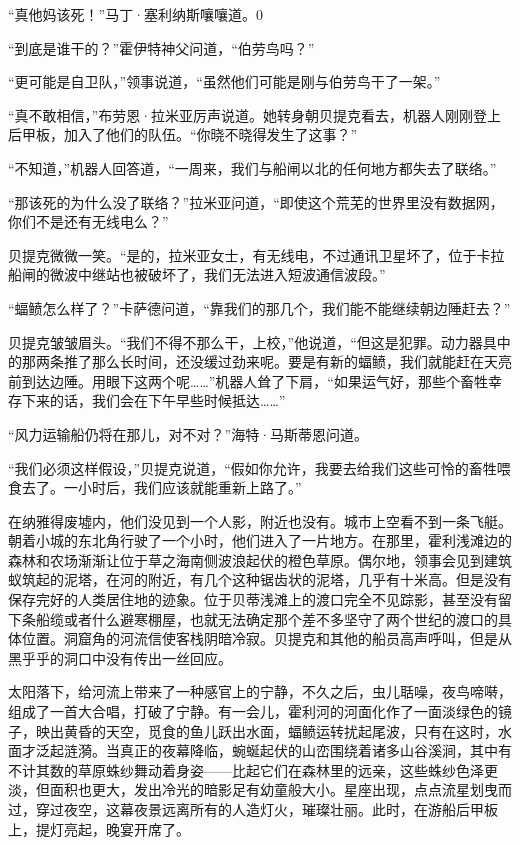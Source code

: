 \documentclass[AutoFakeBold=true]{book}
\begin{document}
``真他妈该死！''马丁·塞利纳斯嚷嚷道。0

``到底是谁干的？''霍伊特神父问道，``伯劳鸟吗？''

``更可能是自卫队，''领事说道，``虽然他们可能是刚与伯劳鸟干了一架。''

``真不敢相信，''布劳恩·拉米亚厉声说道。她转身朝贝提克看去，机器人刚刚登上后甲板，加入了他们的队伍。``你晓不晓得发生了这事？''

``不知道，''机器人回答道，``一周来，我们与船闸以北的任何地方都失去了联络。''

``那该死的为什么没了联络？''拉米亚问道，``即使这个荒芜的世界里没有数据网，你们不是还有无线电么？''

贝提克微微一笑。``是的，拉米亚女士，有无线电，不过通讯卫星坏了，位于卡拉船闸的微波中继站也被破坏了，我们无法进入短波通信波段。''

``蝠鲼怎么样了？''卡萨德问道，``靠我们的那几个，我们能不能继续朝边陲赶去？''

贝提克皱皱眉头。``我们不得不那么干，上校，''他说道，``但这是犯罪。动力器具中的那两条推了那么长时间，还没缓过劲来呢。要是有新的蝠鲼，我们就能赶在天亮前到达边陲。用眼下这两个呢……''机器人耸了下肩，``如果运气好，那些个畜牲幸存下来的话，我们会在下午早些时候抵达……''

``风力运输船仍将在那儿，对不对？''海特·马斯蒂恩问道。

``我们必须这样假设，''贝提克说道，``假如你允许，我要去给我们这些可怜的畜牲喂食去了。一小时后，我们应该就能重新上路了。''

\vspace*{1em}

在纳雅得废墟内，他们没见到一个人影，附近也没有。城市上空看不到一条飞艇。朝着小城的东北角行驶了一个小时，他们进入了一片地方。在那里，霍利浅滩边的森林和农场渐渐让位于草之海南侧波浪起伏的橙色草原。偶尔地，领事会见到建筑蚁筑起的泥塔，在河的附近，有几个这种锯齿状的泥塔，几乎有十米高。但是没有保存完好的人类居住地的迹象。位于贝蒂浅滩上的渡口完全不见踪影，甚至没有留下条船缆或者什么避寒棚屋，也就无法确定那个差不多坚守了两个世纪的渡口的具体位置。洞窟角的河流信使客栈阴暗冷寂。贝提克和其他的船员高声呼叫，但是从黑乎乎的洞口中没有传出一丝回应。

太阳落下，给河流上带来了一种感官上的宁静，不久之后，虫儿聒噪，夜鸟啼啭，组成了一首大合唱，打破了宁静。有一会儿，霍利河的河面化作了一面淡绿色的镜子，映出黄昏的天空，觅食的鱼儿跃出水面，蝠鲼运转扰起尾波，只有在这时，水面才泛起涟漪。当真正的夜幕降临，蜿蜒起伏的山峦围绕着诸多山谷溪涧，其中有不计其数的草原蛛纱舞动着身姿——比起它们在森林里的远亲，这些蛛纱色泽更淡，但面积也更大，发出冷光的暗影足有幼童般大小。星座出现，点点流星划曳而过，穿过夜空，这幕夜景远离所有的人造灯火，璀璨壮丽。此时，在游船后甲板上，提灯亮起，晚宴开席了。
\end{document}
